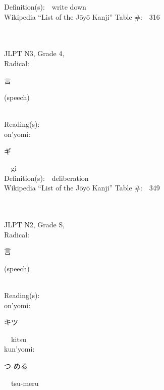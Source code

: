 \begin{multicols}{2}
Definition(s):\ \ write down \\
Wikipedia ``List of the J\=oy\=o Kanji'' Table \#:\ \ 316 \\
\ \ \\
{\fontsize{34pt}{40pt}  }\ \ \\  %
{JLPT N3, Grade 4, \\Radical:\ \ {\begin{CJK}{UTF8}{min} 言 \end{CJK}} (speech) } \\
Reading(s):\ \ \\
{\hspace*{1em}}on'yomi:\ \ \\
{\hspace*{2em}}{\begin{CJK}{UTF8}{min} ギ \end{CJK}}\ \ gi\ \ \\
Definition(s):\ \ deliberation \\
Wikipedia ``List of the J\=oy\=o Kanji'' Table \#:\ \ 349 \\
\ \ \\
{\fontsize{34pt}{40pt}  }\ \ \\  %
{JLPT N2, Grade S, \\Radical:\ \ {\begin{CJK}{UTF8}{min} 言 \end{CJK}} (speech) } \\
Reading(s):\ \ \\
{\hspace*{1em}}on'yomi:\ \ \\
{\hspace*{2em}}{\begin{CJK}{UTF8}{min} キツ \end{CJK}}\ \ kitsu\ \ \\
{\hspace*{1em}}kun'yomi:\ \ \\
{\hspace*{2em}}{\begin{CJK}{UTF8}{min} つ-める \end{CJK}}\ \ tsu-meru\ \ \\

\end{multicols}
